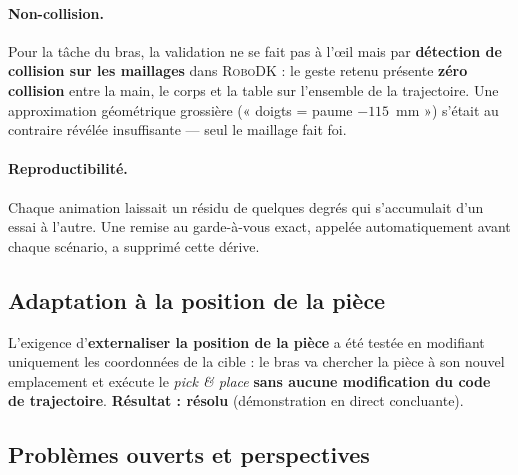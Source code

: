 \documentclass[12pt]{article}
\begin{document}
\paragraph{Non-collision.} Pour la tâche du bras, la validation ne se fait pas à
l'\oe il mais par \textbf{détection de collision sur les maillages} dans
\textsc{RoboDK} : le geste retenu présente \textbf{zéro collision} entre la main,
le corps et la table sur l'ensemble de la trajectoire. Une approximation
géométrique grossière (« doigts = paume $-115$~mm ») s'était au contraire révélée
insuffisante --- seul le maillage fait foi.

\paragraph{Reproductibilité.} Chaque animation laissait un résidu de quelques
degrés qui s'accumulait d'un essai à l'autre. Une remise au garde-à-vous exact,
appelée automatiquement avant chaque scénario, a supprimé cette dérive.

\subsection{Adaptation à la position de la pièce}

L'exigence d'\textbf{externaliser la position de la pièce} a été testée en
modifiant uniquement les coordonnées de la cible : le bras va chercher la pièce à
son nouvel emplacement et exécute le \emph{pick \& place} \textbf{sans aucune
modification du code de trajectoire}. \textbf{Résultat : résolu} (démonstration en
direct concluante).

\subsection{Problèmes ouverts et perspectives}
\end{document}
